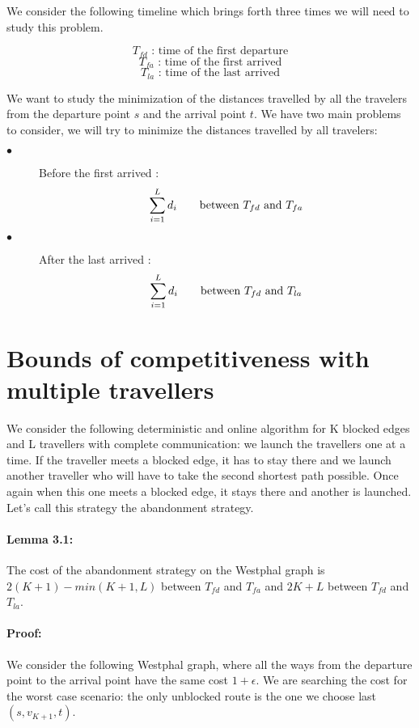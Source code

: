 \documentclass[a4paper, 10pt]{article}
\begin{document}
We consider the following timeline which brings forth three times we will need to study this problem.
\begin{center}
\end{center}
\[
T_{fd} \mbox{\ : time of the first departure}
\]
\[
T_{fa} \mbox{\ : time of the first arrived}
\]
\[
T_{la} \mbox{\ : time of the last arrived}
\]

We want to study the minimization of the distances travelled by all the travelers from the departure point $s$ and the arrival point $t$. We have two main problems to consider, we will try to minimize the distances travelled by all travelers:
\begin{description}
\item[$\bullet$] Before the first arrived :
\[ 
\sum_{i=1}^{L} d_{i} \mbox{\qquad between } T_{fd} \mbox{\ and } T_{fa}
\]
\item[$\bullet$] After the last arrived :
\[ 
\sum_{i=1}^{L} d_{i} \mbox{\qquad between } T_{fd} \mbox{\ and } T_{la}
\]
\end{description}



\section{Bounds of competitiveness with multiple travellers}
We consider the following deterministic and online algorithm for K blocked edges and L travellers with complete communication: we launch the travellers one at a time. If the traveller meets a blocked edge, it has to stay there and we launch another traveller who will have to take the second shortest path possible. Once again when this one meets a blocked edge, it stays there and another is launched. Let's call this strategy the abandonment strategy.


\paragraph{Lemma 3.1:} The cost of the abandonment strategy on the Westphal graph is $2(K+1) - min(K+1,L)$ between $T_{fd}$ and $T_{fa}$ and $2K+L$ between $T_{fd}$ and $T_{la}$.


\paragraph{Proof:} We consider the following Westphal graph, where all the ways from the departure point to the arrival point have the same cost $1+\epsilon$. We are searching the cost for the worst case scenario: the only unblocked route is the one we choose last $(s,v_{K+1},t)$.
\end{document}
